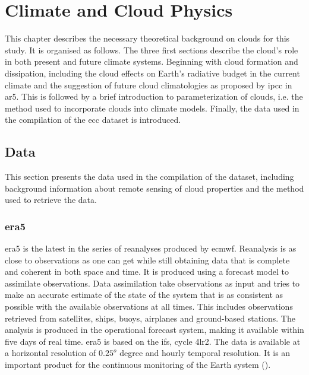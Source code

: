 \setcounter{chapter}{1} 
\chapter{Climate and Cloud Physics}
\label{ch:theoretical_back}
This chapter describes the necessary theoretical background on clouds for this study. It is organised as follows. The three first sections describe the cloud's role in both present and future climate systems. Beginning with cloud formation and dissipation, including the cloud effects on Earth's radiative budget in the current climate and the suggestion of future cloud climatologies as proposed by \acrshort{ipcc} in \acrshort{ar5}. This is followed by a brief introduction to parameterization of clouds, i.e. the method used to incorporate clouds into climate models.
Finally, the data used in the compilation of the \acrshort{ecc} dataset is introduced. 




\section{Data}
This section presents the data used in the compilation of the dataset, including background information about remote sensing of cloud properties and the method used to retrieve the data. 

\subsection{\acrshort{era5}} \label{sec:era5}
\acrshort{era5} is the latest in the series of reanalyses produced by \acrfull{ecmwf}. Reanalysis is as close to observations as one can get while still obtaining data that is complete and coherent in both space and time. It is produced using a forecast model to assimilate observations. Data assimilation take observations as input and tries to make an accurate estimate of the state of the system that is as consistent as possible with the available observations at all times. This includes observations retrieved from satellites, ships, buoys, airplanes and ground-based stations. The analysis is produced in the operational forecast system, making it available within five days of real time. \acrshort{era5} is based on the \acrshort{ifs}, cycle 4lr2. The data is available at a horizontal resolution of $0.25^o$ degree and hourly temporal resolution. It is an important product for the continuous monitoring of the Earth system 
(\cite{Hersbach2018OperationalStatus}).

